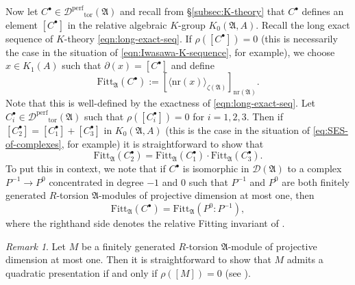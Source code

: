 \documentclass[12pt]{amsart}
\theoremstyle{plain}
\theoremstyle{remark}
\newtheorem{remark}[theorem]{Remark}
\theoremstyle{definition}
\numberwithin{equation}{section}
\begin{document}
Now let $C^{\bullet} \in \mathcal{D}^{\mathrm{perf}}{_{\mathrm{tor}}}(\mathfrak{A})$ and recall from \S \ref{subsec:K-theory}
that $C^{\bullet}$ defines an element $[C^{\bullet}]$ in the relative algebraic $K$-group $K_{0}(\mathfrak{A},A)$.
Recall the long exact sequence of $K$-theory \eqref{eqn:long-exact-seq}.
If $\rho([C^{\bullet}])=0$ (this is necessarily the case in the situation of \eqref{eqn:Iwasawa-K-sequence}, 
for example), we choose  $x \in K_{1}(A)$ such that $\partial(x) = [C^{\bullet}]$ and define
\begin{equation}\label{eqn:fitt-of-complex}
{\mathrm{Fitt}}_{\mathfrak{A}}(C^{\bullet}) := \left[\langle {\mathrm{nr}}(x) \rangle_{\zeta(\mathfrak{A})}\right]_{{\mathrm{nr}}(\mathfrak{A})}.
\end{equation}
Note that this is well-defined by the exactness of \eqref{eqn:long-exact-seq}.
Let $C^{\bullet}_{i} \in \mathcal{D}^{\mathrm{perf}}{_{\mathrm{tor}}}(\mathfrak{A})$ such that $\rho([C_{i}^{\bullet}])=0$ for $i=1,2,3$.
Then if $[C_{2}^{\bullet}] = [C_{1}^{\bullet}] + [C_{3}^{\bullet}]$ in $K_{0}(\mathfrak{A},A)$
(this is the case in the situation of  \eqref{eq:SES-of-complexes}, for example)
it is straightforward to show that 
\begin{equation}\label{eqn:fitt-of-sum-of-complexes-in-rel-K-zero}
{\mathrm{Fitt}}_{\mathfrak{A}}(C_{2}^{\bullet}) = {\mathrm{Fitt}}_{\mathfrak{A}}(C_{1}^{\bullet}) \cdot {\mathrm{Fitt}}_{\mathfrak{A}}(C_{3}^{\bullet}).
\end{equation}
To put this in context, 
we note that if $C^{\bullet}$ is isomorphic in $\mathcal{D}(\mathfrak{A})$ to a complex $P^{-1} \rightarrow P^{0}$ concentrated in
degree $-1$ and $0$ such that $P^{-1}$ and $P^{0}$ are both finitely generated $R$-torsion $\mathfrak{A}$-modules
of projective dimension at most one, then
\begin{equation}\label{eq:rel-fitt-eq}
{\mathrm{Fitt}}_{\mathfrak{A}}(C^{\bullet}) = {\mathrm{Fitt}}_{\mathfrak{A}}(P^{0} : P^{-1}), 
\end{equation}
where the righthand side denotes the relative Fitting invariant of \cite[Definition 3.6]{MR2609173}.

\begin{remark}\label{rmk:quad-pres-rho-is-zero}
Let $M$ be a finitely generated $R$-torsion $\mathfrak{A}$-module of projective dimension at most one.
Then it is straightforward to show that $M$ admits a quadratic presentation if and only if $\rho([M])=0$
(see \cite[p.\ 2764]{MR2609173}). 
\end{remark}
\end{document}
